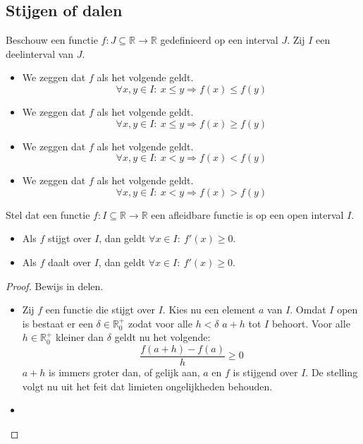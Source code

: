 \documentclass[main.tex]{subfiles}
\begin{document}
\subsection{Stijgen of dalen}
\label{sec:stijgen-dalen}

\begin{de}
  Beschouw een functie $f: J \subseteq \mathbb{R} \rightarrow \mathbb{R}$ gedefinieerd op een interval $J$.
  Zij $I$ een deelinterval van $J$.
  \begin{itemize}
  \item We zeggen dat $f$  als het volgende geldt.
    \[ \forall x,y \in I:\ x \le y \Rightarrow f(x) \le f(y) \]
  \item We zeggen dat $f$  als het volgende geldt.
    \[ \forall x,y \in I:\ x \le y \Rightarrow f(x) \ge f(y) \]
  \item We zeggen dat $f$  als het volgende geldt.
    \[ \forall x,y \in I:\ x < y \Rightarrow f(x) < f(y) \]
  \item We zeggen dat $f$  als het volgende geldt.
    \[ \forall x,y \in I:\ x < y \Rightarrow f(x) > f(y) \]
  \end{itemize}
\end{de}

\begin{bpr}
  Stel dat een functie $f: I \subseteq \mathbb{R} \rightarrow \mathbb{R}$ een afleidbare functie is op een open interval $I$.
  \begin{itemize}
  \item Als $f$ stijgt over $I$, dan geldt $\forall x\in I:\ f'(x) \ge 0$.
  \item Als $f$ daalt over $I$, dan geldt $\forall x\in I:\ f'(x) \ge 0$.
  \end{itemize}

  \begin{proof}
    Bewijs in delen.
    \begin{itemize}
    \item Zij $f$ een functie die stijgt over $I$.
      Kies nu een element $a$ van $I$.
      Omdat $I$ open is bestaat er een $\delta\in \mathbb{R}_{0}^{+}$ zodat voor alle $h<\delta$ $a+h$ tot $I$ behoort.
      Voor alle $h\in \mathbb{R}_{0}^{+}$ kleiner dan $\delta$ geldt nu het volgende:
      \[ \frac{f(a+h)-f(a)}{h} \ge 0 \]
      $a+h$ is immers groter dan, of gelijk aan, $a$ en $f$ is stijgend over $I$.
      De stelling volgt nu uit het feit dat limieten ongelijkheden behouden.
    \item 
    \end{itemize}
  \end{proof}
\end{bpr}
\end{document}
